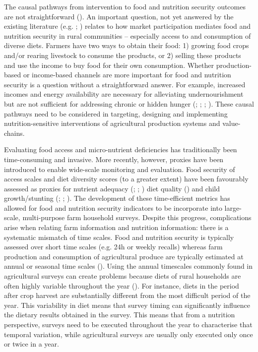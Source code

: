 The causal pathways from intervention to food and nutrition security outcomes are not straightforward (\citealp{Carletto2017}). An important question, not yet answered by the existing literature (e.g. \citealp{Ruel2018}; \citealp{Gillespie2017}) relates to how market participation mediates food and nutrition security in rural communities -- especially access to and consumption of diverse diets. Farmers have two ways to obtain their food: 1) growing food crops and/or rearing livestock to consume the products, or 2) selling these products and use the income to buy food for their own consumption. Whether production-based or income-based channels are more important for food and nutrition security is a question without a straightforward answer. For example, increased incomes and energy availability are necessary for alleviating undernourishment but are not sufficient for addressing chronic or hidden hunger (\citealp{Godecke2018}; \citealp{Schipanski2016}; \citealp{McDermott2015}; \citealp{Hoddinott2012}). These causal pathways need to be considered in targeting, designing and implementing nutrition-sensitive interventions of agricultural production systems and value-chains.

Evaluating food access and micro-nutrient deficiencies has traditionally been time-consuming and invasive. More recently, however, proxies have been introduced to enable wide-scale monitoring and evaluation. Food security of access scales and diet diversity scores (to a greater extent) have been favourably assessed as proxies for nutrient adequacy (\citealp{Lachat2017}; \citealp{Steyn2006}; \citealp{Torheim2004}) diet quality (\citealp{Savy2005}) and child growth/stunting (\citealp{Rah2010}; \citealp{Saha2009}; \citealp{Arimond2004}). The development of these time-efficient metrics has allowed for food and nutrition security indicators to be incorporate into large-scale, multi-purpose farm household surveys. Despite this progress, complications arise when relating farm information and nutrition information: there is a systematic mismatch of time scales. Food and nutrition security is typically assessed over short time scales (e.g. 24h or weekly recalls) whereas farm production and consumption of agricultural produce are typically estimated at annual or seasonal time scales (\citealp{Herrero2007}). Using the annual timescales commonly found in agricultural surveys can create problems because diets of rural households are often highly variable throughout the year (\citealp{Sibhatu2017}). For instance, diets in the period after crop harvest are substantially different from the most difficult period of the year. This variability in diet means that survey timing can significantly influence the dietary results obtained in the survey. This means that from a nutrition perspective, surveys need to be executed throughout the year to characterise that temporal variation, while agricultural surveys are usually only executed only once or twice in a year.

